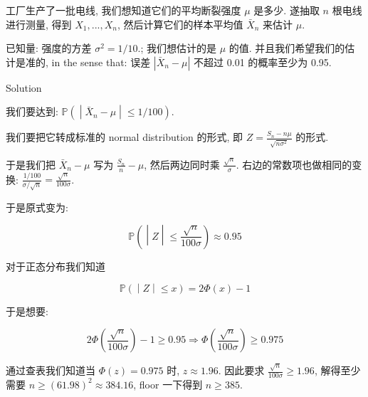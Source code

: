 \begin{example}[(样本量需求的计算)]

工厂生产了一批电线, 我们想知道它们的平均断裂强度 \(\mathit{\mu}\) 是多少. 遂抽取 \(\mathit{n}\) 根电线进行测量, 得到 \(\mathit{X}_{1},...,\mathit{X}_{\mathit{n}}\), 然后计算它们的样本平均值 \({\bar{\mathit{X}}}_{\mathit{n}}\) 来估计 \(\mathit{\mu}\).

已知量: 强度的方差 \(\mathit{\sigma}^{2} = 1/10\).; 我们想估计的是 \(\mathit{\mu}\) 的值. 并且我们希望我们的估计是准的, in the sense that: 误差 \(|{\bar{\mathit{X}}}_{\mathit{n}} - \mathit{\mu}|\) 不超过 0.01 的概率至少为 0.95.

\begin{qlsolution}{Solution}

我们要达到: \(\left. \mathbb{P}( \middle| {\bar{\mathit{X}}}_{\mathit{n}} - \mathit{\mu} \middle| \leq 1/100) \right.\).

我们要把它转成标准的 normal distribution 的形式, 即 \(\mathit{Z} = \frac{\mathit{S}_{\mathit{n}} - \mathit{n}\mathit{\mu}}{\sqrt{\mathit{n}\mathit{\sigma}^{2}}}\) 的形式.

于是我们把 \({\bar{\mathit{X}}}_{\mathit{n}} - \mathit{\mu}\) 写为 \(\frac{\mathit{S}_{\mathit{n}}}{\mathit{n}} - \mathit{\mu}\), 然后两边同时乘 \(\frac{\sqrt{\mathit{n}}}{\mathit{\sigma}}\). 右边的常数项也做相同的变换: \(\frac{1/100}{\mathit{\sigma}/\sqrt{\mathit{n}}} = \frac{\sqrt{\mathit{n}}}{100\mathit{\sigma}}\).

于是原式变为:

\[\left. \mathbb{P}( \middle| \mathit{Z} \middle| \leq \frac{\sqrt{\mathit{n}}}{100\mathit{\sigma}}) \approx 0.95 \right.\]

对于正态分布我们知道

\[\left. \mathbb{P}( \middle| \mathit{Z} \middle| \leq \mathit{x}) = 2\Phi(\mathit{x}) - 1 \right.\]

于是想要:

\[2\Phi\left( \frac{\sqrt{\mathit{n}}}{100\mathit{\sigma}} \right) - 1 \geq 0.95\Longrightarrow\Phi\left( \frac{\sqrt{\mathit{n}}}{100\mathit{\sigma}} \right) \geq 0.975\]

通过查表我们知道当 \(\Phi(\mathit{z}) = 0.975\) 时, \(\mathit{z} \approx 1.96\). 因此要求 \(\frac{\sqrt{\mathit{n}}}{100\mathit{\sigma}} \geq 1.96\), 解得至少需要 \(\mathit{n} \geq (61.98)^{2} \approx 384.16\), floor 一下得到 \(\mathit{n} \geq 385\).

\end{qlsolution}


\end{example}

